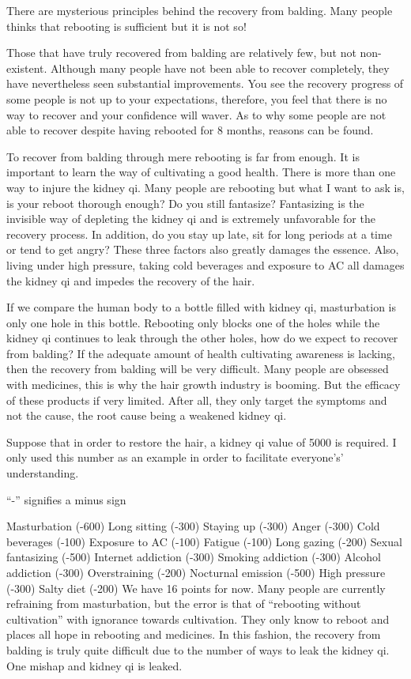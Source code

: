 \documentclass[
]{book}
\begin{document}
There are mysterious principles behind the recovery from balding. Many people thinks that rebooting is sufficient but it is not so!

Those that have truly recovered from balding are relatively few, but not non-existent. Although many people have not been able to recover completely, they have nevertheless seen substantial improvements. You see the recovery progress of some people is not up to your expectations, therefore, you feel that there is no way to recover and your confidence will waver. As to why some people are not able to recover despite having rebooted for 8 months, reasons can be found.

To recover from balding through mere rebooting is far from enough. It is important to learn the way of cultivating a good health. There is more than one way to injure the kidney qi. Many people are rebooting but what I want to ask is, is your reboot thorough enough? Do you still fantasize? Fantasizing is the invisible way of depleting the kidney qi and is extremely unfavorable for the recovery process. In addition, do you stay up late, sit for long periods at a time or tend to get angry? These three factors also greatly damages the essence. Also, living under high pressure, taking cold beverages and exposure to AC all damages the kidney qi and impedes the recovery of the hair.

If we compare the human body to a bottle filled with kidney qi, masturbation is only one hole in this bottle. Rebooting only blocks one of the holes while the kidney qi continues to leak through the other holes, how do we expect to recover from balding? If the adequate amount of health cultivating awareness is lacking, then the recovery from balding will be very difficult. Many people are obsessed with medicines, this is why the hair growth industry is booming. But the efficacy of these products if very limited. After all, they only target the symptoms and not the cause, the root cause being a weakened kidney qi.

Suppose that in order to restore the hair, a kidney qi value of 5000 is required. I only used this number as an example in order to facilitate everyone's' understanding.

``-'' signifies a minus sign

Masturbation (-600)
Long sitting (-300)
Staying up (-300)
Anger (-300)
Cold beverages (-100)
Exposure to AC (-100)
Fatigue (-100)
Long gazing (-200)
Sexual fantasizing (-500)
Internet addiction (-300)
Smoking addiction (-300)
Alcohol addiction (-300)
Overstraining (-200)
Nocturnal emission (-500)
High pressure (-300)
Salty diet (-200)
We have 16 points for now. Many people are currently refraining from masturbation, but the error is that of ``rebooting without cultivation'' with ignorance towards cultivation. They only know to reboot and places all hope in rebooting and medicines. In this fashion, the recovery from balding is truly quite difficult due to the number of ways to leak the kidney qi. One mishap and kidney qi is leaked.
\end{document}
